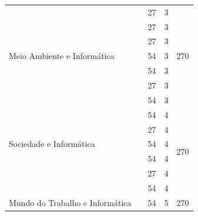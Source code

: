 \documentclass[
	10pt,				%
	openright,			%
	twoside,			%
	a4paper,			%
	english,			%
	french,				%
	brazil,				%
	sumario=tradicional
]{abntex2}
\begin{document}
\begin{table}[H]
{\begin{tabular}{|l|l|c|c|c|}
			\multirow{7}{*}{Meio Ambiente e Informática}                   
			& \nameref{3_poo}                                  & 27                         &  3                & \multirow{7}{*}{270} \\ \cline{2-4}
			& \nameref{3_nosql}                                & 27                         &  3                &                      \\ \cline{2-4}			
			& \nameref{3_testsoft}                             & 27                         &  3                &                      \\ \cline{2-4}
			& \nameref{3_engreq}                               & 54                         &  3                &                      \\ \cline{2-4}
			& \nameref{3_redescomp}                            & 54                         &  3                &                      \\ \cline{2-4}
			& \nameref{3_educamb}                              & 27                         &  3                &                      \\ \cline{2-4}
			& \nameref{3_projamb}                              & 54                         &  3                &                      \\ \hline
			\multirow{5}{*}{Sociedade e Informática}                        
			& \nameref{4_ppw1}                                 & 54                         &  4                & \multirow{6}{*}{270} \\ \cline{2-4}
			& \nameref{4_ihc}                                  & 27                         &  4                &                      \\ \cline{2-4}
			& \nameref{4_asi}                                  & 54                         &  4                &                      \\ \cline{2-4}
			& \nameref{4_probest}                              & 54                         &  4                &                      \\ \cline{2-4}
			& \nameref{4_etnicoraciais}                        & 27                         &  4                &                      \\ \cline{2-4}
			& \nameref{4_projsoc}                              & 54                         &  4                &                      \\ \hline
			\multirow{6}{*}{Mundo do Trabalho e Informática}                          
			& \nameref{5_ppw2}                                & 54                         &  5                & \multirow{6}{*}{270} \\ \cline{2-4}

\end{tabular}}
\end{table}
\end{document}
